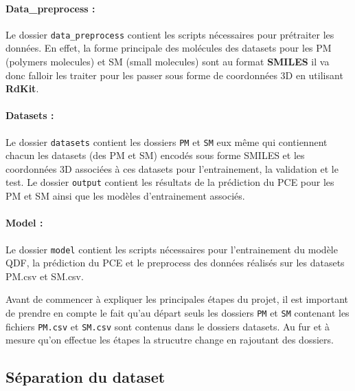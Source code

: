 \paragraph{Data\_preprocess :} 
Le dossier \texttt{data\_preprocess} contient les scripts nécessaires pour prétraiter les données. 
En effet, la forme principale des molécules des datasets pour les PM (polymers molecules) et SM (small molecules) sont au format \textbf{SMILES} il va donc falloir les traiter pour les passer sous forme de coordonnées 3D en utilisant \textbf{RdKit}.

\paragraph{Datasets :}
Le dossier \texttt{datasets} contient les dossiers \texttt{PM} et \texttt{SM} eux même qui contiennent chacun les datasets (des PM et SM) encodés sous forme SMILES et les coordonnées 3D associées à ces datasets pour l'entrainement, la validation et le test.
Le dossier \texttt{output} contient les résultats de la prédiction du PCE pour les PM et SM ainsi que les modèles d'entrainement associés.

\paragraph{Model :}
Le dossier \texttt{model} contient les scripts nécessaires pour l'entrainement du modèle QDF, la prédiction du PCE et le preprocess des données réalisés sur les datasets PM.csv et SM.csv.


Avant de commencer à expliquer les principales étapes du projet, il est important de prendre en compte le fait qu'au départ seuls les dossiers \texttt{PM} et \texttt{SM} contenant les fichiers \texttt{PM.csv} et \texttt{SM.csv} sont contenus dans le dossiers datasets. 
Au fur et à mesure qu'on effectue les étapes la strucutre change en rajoutant des dossiers.

\subsection{Séparation du dataset}


